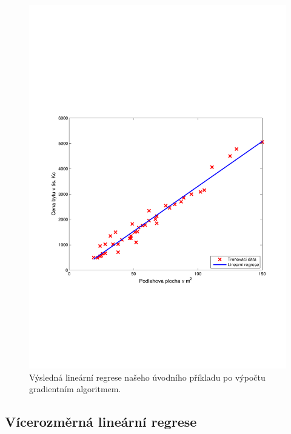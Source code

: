 \begin{figure}[!ht]
	\centering
	\includegraphics[scale = 0.5, trim = 2.5cm 7cm 2cm 9cm]{./Img/LinearniRegrese/cena_plocha_linear_regrese.pdf}
	\caption{Výsledná lineární regrese našeho úvodního příkladu po výpočtu gradientním algoritmem.}
	\label{fig:cena_plocha_linear_regrese}
\end{figure}


\newpage









\subsection{Vícerozměrná lineární regrese}
\label{sec:LinearniRegreseVicePromennych}

